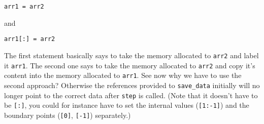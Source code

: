 \documentclass{article}
\newcommand{\ttt}[1]{\texttt{#1}}
\begin{document}
\begin{lstlisting}
arr1 = arr2
\end{lstlisting}
and
\begin{lstlisting}
arr1[:] = arr2
\end{lstlisting}
The first statement basically says to take the memory allocated to \ttt{arr2} and label it \ttt{arr1}. The second one says to take the memory allocated to \ttt{arr2} and copy it's content into the memory allocated to \ttt{arr1}. See now why we have to use the second approach? Otherwise the references provided to \ttt{save\_data} initially will no longer point to the correct data after \ttt{step} is called. (Note that it doesn't have to be \ttt{[:]}, you could for instance have to set the internal values (\ttt{[1:-1]}) and the boundary points (\ttt{[0]}, \ttt{[-1]}) separately.)
\end{document}
